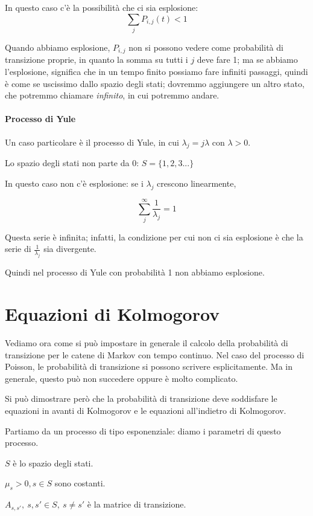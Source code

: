 \documentclass[a4paper,12pt]{book}
\begin{document}
In questo caso c'è la possibilità che ci sia esplosione:
$$ \sum_j P_{i,j}(t) < 1 $$

Quando abbiamo esplosione, $ P_{i,j} $ non si possono vedere come probabilità di transizione proprie, in quanto la somma su tutti i $ j $ deve fare 1; ma se abbiamo l'esplosione, significa che in un tempo finito possiamo fare infiniti passaggi, quindi è come se uscissimo dallo spazio degli stati; dovremmo aggiungere un altro stato, che potremmo chiamare \textit{infinito}, in cui potremmo andare. 

\paragraph{Processo di Yule} Un caso particolare è il processo di Yule, in cui $\lambda_j = j\lambda$ con $\lambda > 0$.

Lo spazio degli stati non parte da 0: $ S = \{1,2,3...\} $

In questo caso non c'è esplosione: se i $\lambda_j$ crescono linearmente,

$$ \sum_j^{\infty} \frac{1}{\lambda_j} = 1 $$

Questa serie è infinita; infatti, la condizione per cui non ci sia esplosione è che la serie di $\frac{1}{\lambda_j}$ sia divergente. 

Quindi nel processo di Yule con probabilità 1 non abbiamo esplosione. 

\section{Equazioni di Kolmogorov}

Vediamo ora come si può impostare in generale il calcolo della probabilità di transizione per le catene di Markov con tempo continuo. Nel caso del processo di Poisson, le probabilità di transizione si possono scrivere esplicitamente. Ma in generale, questo può non succedere oppure è molto complicato. 

 Si può dimostrare però che la probabilità di transizione deve soddisfare le equazioni in avanti di Kolmogorov e le equazioni all'indietro di Kolmogorov. 

Partiamo da un processo di tipo esponenziale: diamo i parametri di questo processo.

$ S $ è lo spazio degli stati. 

$ \mu_s > 0, s \in S$ sono costanti.

$ A_{s,s'}, \ s, s' \in S, \ s\ne s' $ è la matrice di transizione.
\end{document}
